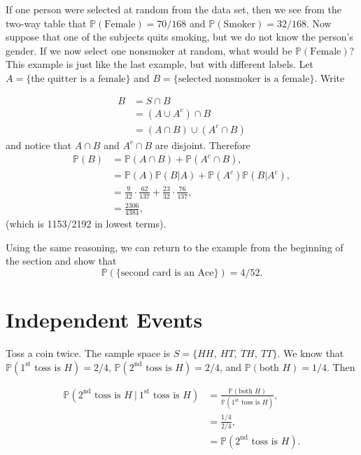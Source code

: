 If one person were selected at random from the data set, then we see
from the two-way table that \(\mathbb{P}(\mbox{Female})=70/168\) and
\(\mathbb{P}(\mbox{Smoker})=32/168\). Now suppose that one of the
subjects quits smoking, but we do not know the person's gender. If we
now select one nonsmoker at random, what would be
\(\mathbb{P}(\mbox{Female})\)? This example is just like the last
example, but with different labels. Let \( A = \{ \mbox{the quitter is
a female} \} \) and \( B = \{ \mbox{selected nonsmoker is a female} \}
\). Write

\begin{align*}
B & =S\cap B\\
 & =(A\cup A^{c})\cap B\\
 & =(A\cap B)\cup(A^{c}\cap B)
\end{align*}
and notice that \(A\cap B\) and \(A^{c}\cap B\) are disjoint. Therefore
\begin{align*}
\mathbb{P}(B) & =\mathbb{P}(A\cap B)+\mathbb{P}(A^{c}\cap B),\\
 & =\mathbb{P}(A)\mathbb{P}(B|A)+\mathbb{P}(A^{c})\mathbb{P}(B|A^{c}),\\
 & =\frac{9}{32}\cdot\frac{62}{137}+\frac{23}{32}\cdot\frac{76}{137},\\
 & =\frac{2306}{4384},
\end{align*}
(which is 1153/2192 in lowest terms).


Using the same reasoning, we can return to the example from the
beginning of the section and show that 
\[ \mathbb{P}(\{ \mbox{second
card is an Ace} \} )=4/52.  
\]

\section{Independent Events}
\label{sec-4-7}

Toss a coin twice. The sample space is \(S= \{ HH,\ HT,\ TH,\ TT \}
\). We know that \(\mathbb{P}(1^{\mathrm{st}}\mbox{ toss is }H)=2/4\),
\(\mathbb{P}(2^{\mathrm{nd}}\mbox{ toss is }H)=2/4\), and
\(\mathbb{P}(\mbox{both }H)=1/4\). Then

\begin{align*} 
\mathbb{P}(2^{\mathrm{nd}}\mbox{ toss is }H\ \vert \ 1^{\mathrm{st}}\mbox{ toss is }H) & =\frac{\mathbb{P}(\mbox{both }H)}{\mathbb{P}(1^{\mathrm{st}}\mbox{ toss is }H)}, \\
 & =\frac{1/4}{2/4},\\
 & =\mathbb{P}(2^{\mathrm{nd}}\mbox{ toss is }H).
\end{align*}

